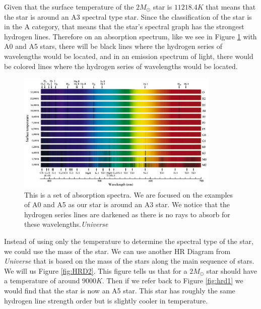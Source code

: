 \documentclass{article}
\begin{document}
\begin{multicols}{2}

Given that the surface temperature of the $2M_\odot$ star is $11218.4K$ that means that the star is around an A3 spectral type star. Since the classification of the star is in the A category, that means that the star's spectral graph has the strongest hydrogen lines. Therefore on an absorption spectrum, like we see in Figure \ref{fig:spectraltypes1} with A0 and A5 stars, there will be black lines where the hydrogen series of wavelengths would be located, and in an emission spectrum of light, there would be colored lines where the hydrogen series of wavelengths would be located.

\end{multicols}

\begin{figure}
  \centering
  \includegraphics[width=0.86\textwidth]{Spectral_Types1.jpg}
  \caption{This is a set of absorption spectra. We are focused on the examples of A0 and A5 as our star is around an A3 star. We notice that the hydrogen series lines are darkened as there is no rays to absorb for these wavelengths.\textit{Universe}}
  \label{fig:spectraltypes1}
\end{figure}

\begin{multicols}{2}

Instead of using only the temperature to determine the spectral type of the star, we could use the mass of the star. We can use another HR Diagram from \textit{Universe} that is based on the mass of the stars along the main sequence of stars. We will us Figure \ref{fig:HRD2}. This figure tells us that for a $2M_\odot$ star should have a temperature of around $9000K$. Then if we refer back to Figure \ref{fig:hrd1} we would find that the star is now an A5 star. This star has roughly the same hydrogen line strength order but is slightly cooler in temperature.

\end{multicols}
\end{document}

